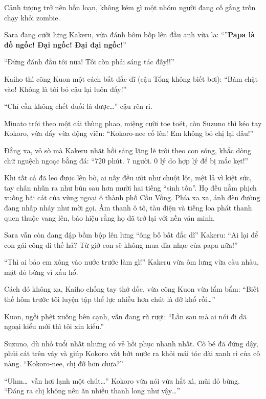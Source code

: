 \documentclass[../main.tex]{subfiles}
\begin{document}
Cảnh tượng trở nên hỗn loạn, không kém gì một nhóm người đang cố gắng trốn chạy khỏi zombie.


Sara đang cưỡi lưng Kakeru, vừa đánh bôm bốp lên đầu anh vừa la: ``''\textbf{Papa là đồ ngốc! Đại ngốc! Đại đại ngốc!}''

``Đừng đánh đầu tôi nữa! Tôi còn phải sáng tác đấy!!''

Kaiho thì cõng Kuon một cách bất đắc dĩ (cậu Tổng không biết bơi): ``Bám chặt vào! Không là tôi bỏ cậu lại luôn đấy!''

``Chỉ cần không chết đuối là được\dots'' cậu rên rỉ.

Minato trôi theo một cái thùng phao, miệng cười toe toét, còn Suzuno thì kéo tay Kokoro, vừa đẩy vừa động viên: ``Kokoro-nee cố lên! Em không bỏ chị lại đâu!''

Đằng xa, vỏ sò mà Kakeru nhặt hồi sáng lặng lẽ trôi theo con sóng, khắc dòng chữ nguệch ngoạc bằng đá: ``720 phút. 7 người. 0 lý do hợp lý để bị mắc kẹt!''

\omk

Khi tất cả đã leo được lên bờ, ai nấy đều ướt như chuột lột, mệt lả vì kiệt sức, tay chân nhũn ra như bún sau hơn mười hai tiếng ``sinh tồn''. Họ đều nằm phịch xuống bãi cát của vùng ngoại ô thành phố Cầu Vồng. Phía xa xa, ánh đèn đường đang nhấp nháy như mời gọi. Âm thanh ô tô, tàu điện và tiếng loa phát thanh quen thuộc vang lên, báo hiệu rằng họ đã trở lại với nền văn minh.

Sara vẫn còn đang đập bồm bộp lên lưng ``ông bố bất đắc dĩ'' Kakeru: ``Ai lại để con gái cõng đi thế hả? Từ giờ con sẽ không mua đĩa nhạc của papa nữa!''

``Thì ai bảo em xông vào nước trước làm gì!'' Kakeru vừa ôm lưng vừa càu nhàu, mặt đỏ bừng vì xấu hổ.

Cách đó không xa, Kaiho chống tay thở dốc, vừa cõng Kuon vừa lẩm bẩm: ``Biết thế hôm trước tôi luyện tập thể lực nhiều hơn chút là đỡ khổ rồi\dots''

Kuon, ngồi phệt xuống bên cạnh, vẫn đang rũ rượi: ``Lần sau mà ai nói đi dã ngoại kiểu mới thì tôi xin kiếu.''

Suzuno, dù nhỏ tuổi nhất nhưng có vẻ hồi phục nhanh nhất. Cô bé đã đứng dậy, phủi cát trên váy và giúp Kokoro vắt bớt nước ra khỏi mái tóc dài xanh rì của cô nàng. ``Kokoro-nee, chị đỡ hơn chưa?''

``Uhm\dots\ vẫn hơi lạnh một chút\dots'' Kokoro vừa nói vừa hắt xì, mũi đỏ bừng. ``Đáng ra chị không nên ăn nhiều thanh long như vậy\dots''
\end{document}
